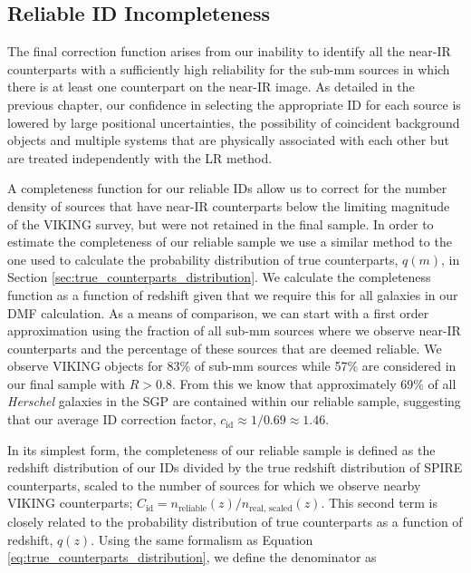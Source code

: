 \subsection{Reliable ID Incompleteness}

The final correction function arises from our inability to identify all the near-IR counterparts with a sufficiently high reliability for the sub-mm sources in which there is at least one counterpart on the near-IR image. As detailed in the previous chapter, our confidence in selecting the appropriate ID for each source is lowered by large positional uncertainties, the possibility of coincident background objects and multiple systems that are physically associated with each other but are treated independently with the LR method.

A completeness function for our reliable IDs allow us to correct for the number density of sources that have near-IR counterparts below the limiting magnitude of the VIKING survey, but were not retained in the final sample. In order to estimate the completeness of our reliable sample we use a similar method to the one used to calculate the probability distribution of true counterparts, $q(m)$, in Section \ref{sec:true_counterparts_distribution}. We calculate the completeness function as a function of redshift given that we require this for all galaxies in our DMF calculation. As a means of comparison, we can start with a first order approximation using the fraction of all sub-mm sources where we observe near-IR counterparts and the percentage of these sources that are deemed reliable. We observe VIKING objects for 83\% of sub-mm sources while 57\% are considered in our final sample with $R > 0.8$. From this we know that approximately 69\% of all \textit{Herschel} galaxies in the SGP are contained within our reliable sample, suggesting that our average ID correction factor, $c_{\textrm{id}} \approx 1/0.69 \approx 1.46$.

In its simplest form, the completeness of our reliable sample is defined as the redshift distribution of our IDs divided by the true redshift distribution of SPIRE counterparts, scaled to the number of sources for which we observe nearby VIKING counterparts; $C_{\textrm{id}} = n_{\textrm{reliable}}(z)/n_{\textrm{real, scaled}}(z)$. This second term is closely related to the probability distribution of true counterparts as a function of redshift, $q(z)$. Using the same formalism as Equation \ref{eq:true_counterparts_distribution}, we define the denominator as

